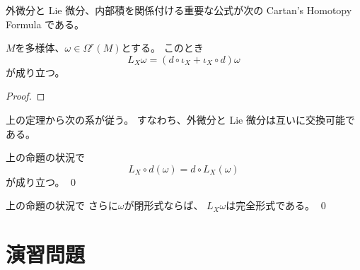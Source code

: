 \documentclass[report]{jlreq}
\begin{document}
外微分と Lie 微分、内部積を関係付ける重要な公式が次の
Cartan's Homotopy Formula である。

\begin{theorem}
    $M$を多様体、$\omega \in \Omega^r(M)$とする。
    このとき
    \begin{equation}
        L_X \omega
            = (d \circ \iota_X + \iota_X \circ d) \omega
    \end{equation}
    が成り立つ。
\end{theorem}

\begin{proof}
    \TODO{}
\end{proof}

上の定理から次の系が従う。
すなわち、外微分と Lie 微分は互いに交換可能である。

\begin{corollary}
    上の命題の状況で
    \begin{equation}
        L_X \circ d (\omega) = d \circ L_X (\omega)
    \end{equation}
    が成り立つ。
    \qed
\end{corollary}

\begin{corollary}
    上の命題の状況で
    さらに$\omega$が閉形式ならば、
    $L_X \omega$は完全形式である。
    \qed
\end{corollary}





%
\newpage
\section{演習問題}

\end{document}
